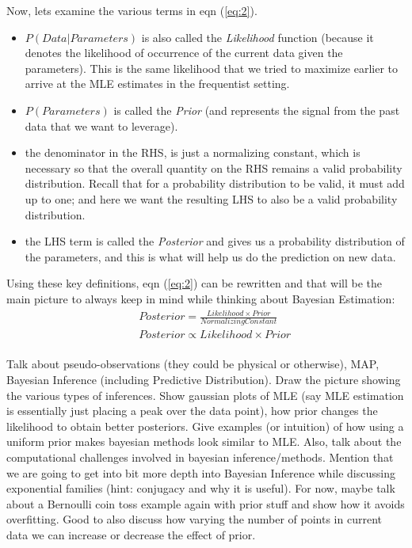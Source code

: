 \documentclass[a4paper]{article}
\begin{document}
\noindent Now, lets examine the various terms in eqn (\ref{eq:2}). 
\begin{itemize}
\item $P(Data|Parameters)$ is also called the \textit{Likelihood} function (because it denotes the likelihood of occurrence of the current data given the parameters). This is the same likelihood that we tried to maximize earlier to arrive at the MLE estimates in the frequentist setting.
\item $P(Parameters)$ is called the \textit{Prior} (and represents the signal from the past data that we want to leverage).
\item the denominator in the RHS, is just a normalizing constant, which is necessary so that the overall quantity on the RHS remains a valid probability distribution. Recall that for a probability distribution to be valid, it must add up to one; and here we want the resulting LHS to also be a valid probability distribution.
\item the LHS term is called the \textit{Posterior} and gives us a probability distribution of the parameters, and this is what will help us do the prediction on new data.
\end{itemize}

\noindent Using these key definitions, eqn (\ref{eq:2}) can be rewritten and that will be the main picture to always keep in mind while thinking about Bayesian Estimation:
\begin{equation} \label{eq:3}
\begin{aligned}
& & Posterior = \frac{ Likelihood \times Prior}{Normalizing Constant}\\
& & Posterior \propto Likelihood \times Prior \\
\end{aligned}
\end{equation}

\noindent Talk about pseudo-observations (they could be physical or otherwise), MAP, Bayesian Inference (including Predictive Distribution). Draw the picture showing the various types of inferences. Show gaussian plots of MLE (say MLE estimation is essentially just placing a peak over the data point), how prior changes the likelihood to obtain better posteriors. Give examples (or intuition) of how using a uniform prior makes bayesian methods look similar to MLE. Also, talk about the computational challenges involved in bayesian inference/methods. Mention that we are going to get into bit more depth into Bayesian Inference while discussing exponential families (hint: conjugacy and why it is useful). For now, maybe talk about a Bernoulli coin toss example again with prior stuff and show how it avoids overfitting. Good to also discuss how varying the number of points in current data we can increase or decrease the effect of prior.
\end{document}
